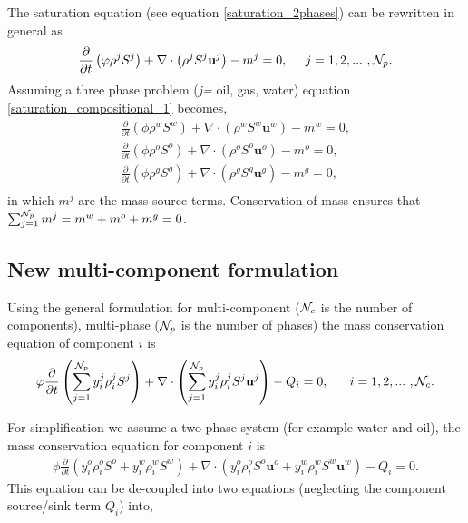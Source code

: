  The saturation equation (see equation \ref{saturation_2phases}) can be rewritten 
 in general as
\begin{equation}
\displaystyle\frac{\partial}{\partial t}\left(\phi\rho^{j}S^{j}\right) + \nabla\cdot\left(\rho^{j}S^{j}\mathbf{u}^{j}\right) -m^{j} = 0,\;\;\;\;\; j = 1,2,...~, {\cal N}_p .
\label{saturation_compositional_1}
\end{equation}
Assuming a three phase problem ({\it j=} oil, gas, water)  
equation \ref{saturation_compositional_1} becomes,
\begin{eqnarray}
\displaystyle\frac{\partial}{\partial t}\left(\phi\rho^{w}S^{w}\right) + \nabla\cdot\left(\rho^{w}S^{w}\mathbf{u}^{w}\right) -m^{w} = 0, \nonumber \\
\displaystyle\frac{\partial}{\partial t}\left(\phi\rho^{o}S^{o}\right) + \nabla\cdot\left(\rho^{o}S^{o}\mathbf{u}^{o}\right) -m^{o} = 0, \\
\displaystyle\frac{\partial}{\partial t}\left(\phi\rho^{g}S^{g}\right) + \nabla\cdot\left(\rho^{g}S^{g}\mathbf{u}^{g}\right) -m^{g} = 0, \nonumber \\
\label{saturation_compositional_2}
\end{eqnarray}
in which $m^j$ are the mass source terms. Conservation of 
mass ensures that $\sum_{j=1}^{{\cal N}_p} m^j=m^{w}+m^{o}+m^{g}=0$. 


\subsection{New multi-component formulation}
Using the general formulation for multi-component (${\cal N}_c$ is the number of components), multi-phase (${\cal N}_p$ is the number of phases) the mass conservation equation of component $i$ is
\begin{equation}
\phi \displaystyle\frac{\partial}{\partial t}\left(\sum\limits_{j=1}^{{\cal N}_p}y_{i}^{j}\rho_{i}^{j}S^{j}\right) + \nabla\cdot\left(\sum\limits_{j=1}^{{\cal N}_p}y_{i}^{j}\rho_{i}^{j}S^{j}\mathbf{u}^{j}\right) - Q_{i} = 0, ~~~~~ i = 1,2,...~ , {\cal N}_c . 
\label{saturation_compositional_4}
\end{equation}

For simplification we assume a two phase system (for example water and oil), the mass conservation equation for component $i$ is 
\begin{eqnarray}
\phi \displaystyle\frac{\partial}{\partial t}\left(y_{i}^{o}\rho_i^{o}S^{o} + y_{i}^{w}\rho_i^{w}S^{w}  \right) + 
\nabla\cdot\left(y_{i}^{o}\rho_i^{o}S^{o}\mathbf{u}^{o} + y_{i}^{w}\rho_i^{w}S^{w}\mathbf{u}^{w}  \right) - Q_{i} = 0 . 
\end{eqnarray}
This equation can be de-coupled into 
two equations (neglecting the component source/sink term $Q_i$) into,


